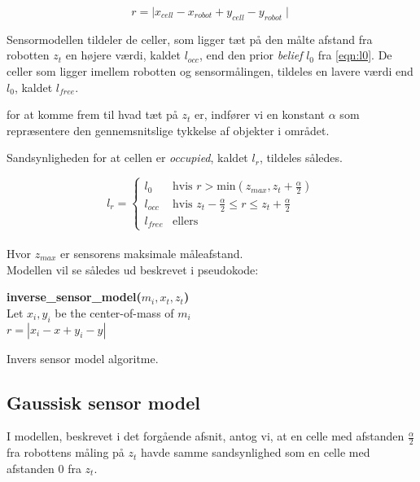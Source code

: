 \begin{equation}
r = \mid x_{cell} - x_{robot} + y_{cell} - y_{robot} \mid
\end{equation}

Sensormodellen tildeler de celler, som ligger tæt på den målte afstand fra robotten $z_t$ en højere værdi, kaldet $l_{occ}$, end den prior \textit{belief} $l_0$ fra \cref{eqn:l0}.
De celler som ligger imellem robotten og sensormålingen, tildeles en lavere værdi end $l_0$, kaldet $l_{free}$. 

for at komme frem til hvad tæt på $z_t$ er, indfører vi en konstant $\alpha$ som repræsentere den gennemsnitslige tykkelse af objekter i området.

Sandsynligheden for at cellen er \emph{occupied}, kaldet $l_r$, tildeles således.

\begin{equation}
l_{r} = \begin{cases} 
	l_0 &\text{hvis }r > \text{min}(z_{max},z_t+\frac{\alpha}{2}) \\ 
	l_{occ} &\text{hvis } z_t-\frac{\alpha}{2} \leq r \leq z_t+\frac{\alpha}{2}\\ 
	l_{free} &\text{ellers}  
\end{cases}
\end{equation} \\
Hvor $z_{max}$ er sensorens maksimale måleafstand.
\\
Modellen vil se således ud beskrevet i pseudokode:

\begin{algorithm}[H]
\textbf{inverse\_sensor\_model($m_i, x_t, z_t$)} \\
Let $x_i,y_i$ be the center-of-mass of $m_i$ \\
$r = |x_i - x + y_i - y|$ \\
\caption{Invers sensor model algoritme.}
\label{alg:inversesensormodel}
\end{algorithm}

\subsection{Gaussisk sensor model}\label{mapping:gaussisk}

I modellen, beskrevet i det forgående afsnit, antog vi, at en celle
med afstanden $\frac{\alpha}{2}$ fra robottens måling på $z_t$ havde
samme sandsynlighed som en celle med afstanden 0 fra $z_t$.

